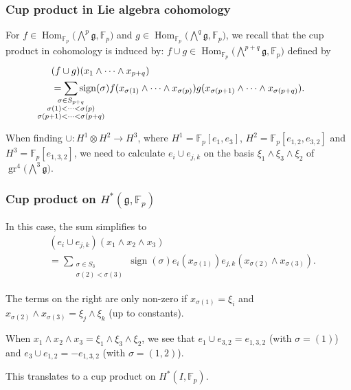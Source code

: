 \documentclass{beamer}
\newcommand*\F{\mathbb{F}}
\DeclareMathOperator{\Hom}{Hom} %
\DeclareMathOperator{\gr}{gr} %
\DeclareMathOperator{\sign}{sign}
\newcommand*{\lie}[1]{\mathfrak{#1}} %
\begin{document}
\begin{frame}[fragile]
  \frametitle{Cup product in Lie algebra cohomology}

  For $f \in \Hom_{\F_{p}}\bigl( \bigwedge^{p}\lie{g},\F_{p} \bigr)$ and $g \in \Hom_{\F_{p}}\bigl( \bigwedge^{q}\lie{g},\F_{p} \bigr)$, we recall that the cup product in cohomology is induced by: $f \cup g \in \Hom_{\F_{p}}\bigl( \bigwedge^{p+q}\lie{g}, \F_{p} \bigr)$ defined by
  \begin{align*}
    &(f \cup g)(x_{1} \wedge \dotsb \wedge x_{p+q}) \\
    &= \sum_{\mathclap{\substack{ \sigma \in S_{p+q} \\ \sigma(1) < \dotsb < \sigma(p) \\ \sigma(p+1) < \dotsb < \sigma(p+q) }}} \sign(\sigma) f(x_{\sigma(1)} \wedge \dotsb \wedge x_{\sigma(p)}) g(x_{\sigma(p+1)} \wedge \dotsb \wedge x_{\sigma(p+q)}).
  \end{align*}

  When finding $\cup \colon H^{1} \otimes H^{2} \to H^{3}$, where $H^{1} = \F_{p}[e_{1},e_{3}]$, $H^{2} = \F_{p}[e_{1,2},e_{3,2}]$ and $H^{3} = \F_{p}[e_{1,3,2}]$, we need to calculate $e_{i} \cup e_{j,k}$ on the basis $\xi_{1} \wedge \xi_{3} \wedge \xi_{2}$ of $\gr^{4} \bigl( \bigwedge^{3}\lie{g} \bigr)$.
\end{frame}

\begin{frame}
  \frametitle{Cup product on $H^{*}(\lie{g},\F_{p})$}

  In this case, the sum simplifies to
  \begin{align*}
    &(e_{i} \cup e_{j,k})(x_{1} \wedge x_{2} \wedge x_{3}) \\
    &= \sum_{\substack{ \sigma\in S_{3} \\ \sigma(2)<\sigma(3) }} \sign(\sigma)e_{i}(x_{\sigma(1)}) e_{j,k}(x_{\sigma(2)} \wedge x_{\sigma(3)}).
  \end{align*}

  The terms on the right are only non-zero if $x_{\sigma(1)} = \xi_{i}$ and $x_{\sigma(2)} \wedge x_{\sigma(3)} = \xi_{j} \wedge \xi_{k}$ (up to constants). \\[1em]
  \pause

  When $x_{1} \wedge x_{2} \wedge x_{3} = \xi_{1} \wedge \xi_{3} \wedge \xi_{2}$, we see that $e_{1} \cup e_{3,2} = e_{1,3,2}$ (with $\sigma = (1)$) and $e_{3} \cup e_{1,2} = -e_{1,3,2}$ (with $\sigma = (1,2)$).

  This translates to a cup product on $H^{*}(I,\F_{p})$.
\end{frame}
\end{document}
